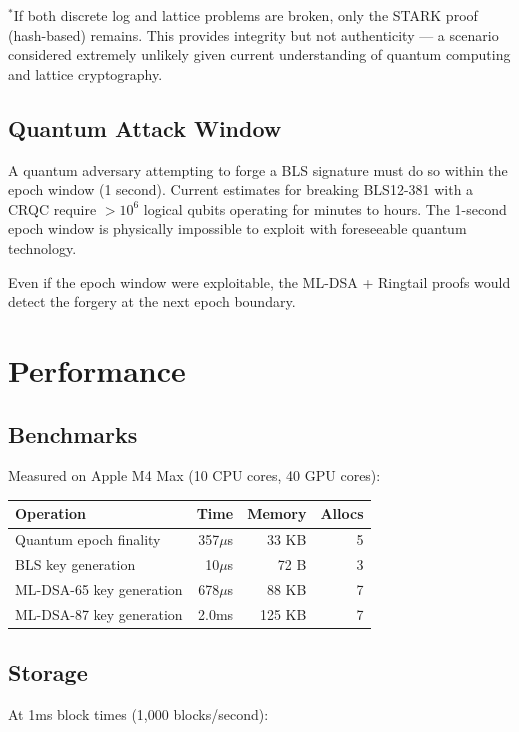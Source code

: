 \documentclass[11pt,a4paper]{article}
\begin{document}
$^*$If both discrete log and lattice problems are broken, only the STARK proof (hash-based) remains. This provides integrity but not authenticity --- a scenario considered extremely unlikely given current understanding of quantum computing and lattice cryptography.

\subsection{Quantum Attack Window}

A quantum adversary attempting to forge a BLS signature must do so within the epoch window (1 second). Current estimates for breaking BLS12-381 with a CRQC require $>10^6$ logical qubits operating for minutes to hours. The 1-second epoch window is physically impossible to exploit with foreseeable quantum technology.

Even if the epoch window were exploitable, the ML-DSA + Ringtail proofs would detect the forgery at the next epoch boundary.

\section{Performance}

\subsection{Benchmarks}

Measured on Apple M4 Max (10 CPU cores, 40 GPU cores):

\begin{center}
\begin{tabular}{lrrr}
\toprule
\textbf{Operation} & \textbf{Time} & \textbf{Memory} & \textbf{Allocs} \\
\midrule
Quantum epoch finality & 357$\mu$s & 33 KB & 5 \\
BLS key generation & 10$\mu$s & 72 B & 3 \\
ML-DSA-65 key generation & 678$\mu$s & 88 KB & 7 \\
ML-DSA-87 key generation & 2.0ms & 125 KB & 7 \\
\bottomrule
\end{tabular}
\end{center}

\subsection{Storage}

At 1ms block times (1,000 blocks/second):
\end{document}
